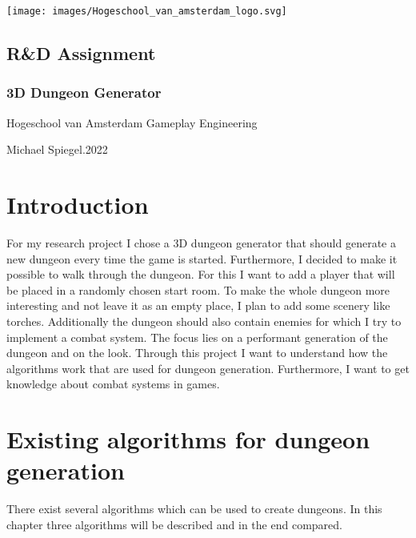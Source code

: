 \documentclass[a4paper,12pt,oneside]{scrreprt}
\begin{document}
\thispagestyle{empty}
\begin{titlepage}
  \begin{flushright}
  \texttt{[image: images/Hogeschool\_van\_amsterdam\_logo.svg]}
  \end{flushright}
  \begin{flushleft}
  \section*{R\&D Assignment}
  \subsection*{3D Dungeon Generator}

  \vspace{1cm}
  Hogeschool van Amsterdam\newline
  Gameplay Engineering

  \vspace{0.5cm}

  Michael Spiegel.2022
  \end{flushleft}
\end{titlepage}

\tableofcontents

\chapter{Introduction}
For my research project I chose a 3D dungeon generator that should generate a new dungeon every time the game is started. Furthermore, I decided to make it possible to walk through the dungeon. For this I want to add a player that will be placed in a randomly chosen start room. To make the whole dungeon more interesting and not leave it as an empty place, I plan to add some scenery like torches. Additionally the dungeon should also contain enemies for which I try to implement a combat system. The focus lies on a performant generation of the dungeon and on the look. Through this project I want to understand how the algorithms work that are used for dungeon generation. Furthermore, I want to get knowledge about combat systems in games.

\chapter{Existing algorithms for dungeon generation}
There exist several algorithms which can be used to create dungeons. In this chapter three algorithms will be described and in the end compared. 
\end{document}
